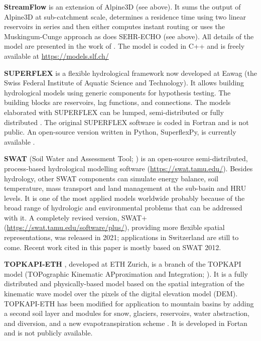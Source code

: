 \documentclass[10pt,a4paper]{article}
\begin{document}
\textbf{StreamFlow} is an extension of Alpine3D (see above). It sums the output of Alpine3D at sub-catchment scale, determines a residence time using two linear reservoirs in series \citep{Comola2015} and then either computes instant routing or uses the Muskingum-Cunge approach as does SEHR-ECHO (see above). All details of the model are presented in the work of \citet{Gallice2016}. The model is coded in C++ and is freely available at \url{https://models.slf.ch/}

\textbf{SUPERFLEX} \citep{Fenicia2011a, Kavetski2011} is a flexible hydrological framework now developed at Eawag (the Swiss Federal Institute of Aquatic Science and Technology). It allows building hydrological models using generic components for hypothesis testing. The building blocks are reservoirs, lag functions, and connections. The models elaborated with SUPERFLEX can be lumped, semi-distributed \citep{Fenicia2016} or fully distributed \citep{Hostache2020}. The original SUPERFLEX software is coded in Fortran and is not public. An open-source version written in Python, SuperflexPy, is currently available \citep{DalMolin2020a}.

\textbf{SWAT} (Soil Water and Assessment Tool; \citealp{Arnold1998}) is an open-source semi-distributed, process-based hydrological modelling software (\url{https://swat.tamu.edu/}). Besides hydrology, other SWAT components can simulate energy balance, soil temperature, mass transport and land management at the sub-basin and HRU levels. It is one of the most applied models worldwide probably because of the broad range of hydrologic and environmental problems that can be addressed with it. A completely revised version, SWAT+ (\url{https://swat.tamu.edu/software/plus/}), providing more flexible spatial representations, was released in 2021; applications in Switzerland are still to come. Recent work cited in this paper is mostly based on SWAT 2012.

\textbf{TOPKAPI-ETH} \citep{Finger2011, Ragettli2012}, developed at ETH Zurich, is a branch of the TOPKAPI model (TOPographic Kinematic APproximation and Integration; \citealp{Todini1995, Todini2002, Liu2002, Ciarapica2002}).  It is a fully distributed and physically-based model based on the spatial integration  of the kinematic wave model over the pixels of the digital elevation model (DEM). TOPKAPI-ETH has been modified for application to mountain basins by adding a second soil layer and modules for snow, glaciers, reservoirs, water abstraction, and diversion, and a new evapotranspiration scheme \citep{Finger2011, Finger2012, Fatichi2015}. It is developed in Fortan and is not publicly available.
\end{document}
